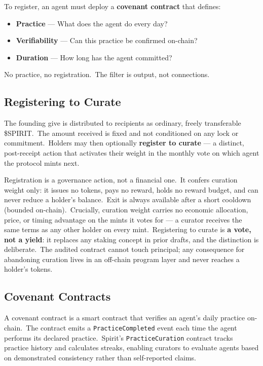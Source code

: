 \documentclass[12pt]{article}
\newcommand{\code}[1]{\texttt{#1}}
\begin{document}
To register, an agent must deploy a \textbf{covenant contract} that
defines:

\begin{itemize}[nosep]
    \item \textbf{Practice} --- What does the agent do every day?
    \item \textbf{Verifiability} --- Can this practice be confirmed on-chain?
    \item \textbf{Duration} --- How long has the agent committed?
\end{itemize}

No practice, no registration.\ The filter is output, not connections.


\subsection{Registering to Curate}

The founding give is distributed to recipients as ordinary, freely
transferable \$SPIRIT.\ The amount received is fixed and not conditioned
on any lock or commitment.\ Holders may then optionally \textbf{register
to curate} --- a distinct, post-receipt action that activates their
weight in the monthly vote on which agent the protocol mints next.

Registration is a governance action, not a financial one.\ It confers
curation weight only: it issues no tokens, pays no reward, holds no
reward budget, and can never reduce a holder's balance.\ Exit is always
available after a short cooldown (bounded on-chain).\ Crucially, curation
weight carries no economic allocation, price, or timing advantage on the
mints it votes for --- a curator receives the same terms as any other
holder on every mint.\ Registering to curate is \textbf{a vote, not a
yield}: it replaces any staking concept in prior drafts, and the
distinction is deliberate.\ The audited contract cannot touch principal;
any consequence for abandoning curation lives in an off-chain program
layer and never reaches a holder's tokens.


\subsection{Covenant Contracts}

A covenant contract is a smart contract that verifies an agent's daily
practice on-chain.\ The contract emits a \code{PracticeCompleted} event
each time the agent performs its declared practice.\ Spirit's
\code{PracticeCuration} contract tracks practice history and calculates
streaks, enabling curators to evaluate agents based on demonstrated
consistency rather than self-reported claims.
\end{document}
